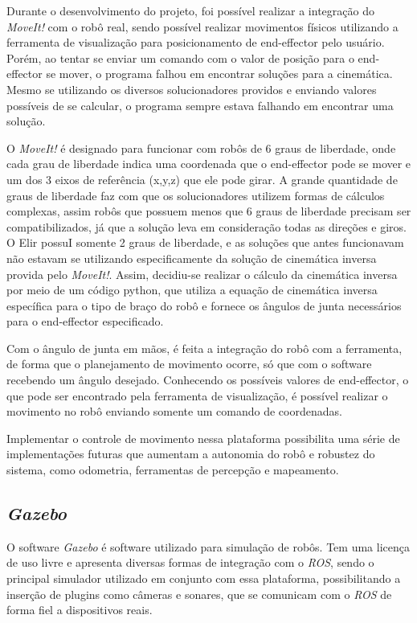 Durante o desenvolvimento do projeto, foi possível realizar a integração do \textit{MoveIt!} com o robô real, sendo possível realizar movimentos físicos utilizando a ferramenta de visualização para posicionamento de end-effector pelo usuário. Porém, ao tentar se enviar um comando com o valor de posição para o end-effector se mover, o programa falhou em encontrar soluções para a cinemática. Mesmo se utilizando os diversos solucionadores providos e enviando valores possíveis de se calcular, o programa sempre estava falhando em encontrar uma solução.

O \textit{MoveIt!} é designado para funcionar com robôs de 6 graus de liberdade, onde cada grau de liberdade indica uma coordenada que o end-effector pode se mover e um dos 3 eixos de referência (x,y,z) que ele pode girar. A grande quantidade de graus de liberdade faz com que os solucionadores utilizem formas de cálculos complexas, assim robôs que possuem menos que 6 graus de liberdade precisam ser compatibilizados, já que a solução leva em consideração todas as direções e giros. O Elir possuI somente 2 graus de liberdade, e as soluções que antes funcionavam não estavam se utilizando especificamente da solução de cinemática inversa provida pelo \textit{MoveIt!}. Assim, decidiu-se realizar o cálculo da cinemática inversa por meio de um código python, que utiliza a equação de cinemática inversa específica para o tipo de braço do robô e fornece os ângulos de junta necessários para o end-effector especificado. 

Com o ângulo de junta em mãos, é feita a integração do robô com a ferramenta, de forma que o planejamento de movimento ocorre, só que com o software recebendo um ângulo desejado. Conhecendo os possíveis valores de end-effector, o que pode ser encontrado pela ferramenta de visualização, é possível realizar o movimento no robô enviando somente um comando de coordenadas.

Implementar o controle de movimento nessa plataforma possibilita uma série de implementações futuras que aumentam a autonomia do robô e robustez do sistema, como odometria, ferramentas de percepção e mapeamento.

\subsection{\textit{Gazebo}}
O software \textit{Gazebo} é software utilizado para simulação de robôs. Tem uma licença de uso livre e apresenta diversas formas de integração com o \textit{ROS}, sendo o principal simulador utilizado em conjunto com essa plataforma, possibilitando a inserção de plugins como câmeras e sonares, que se comunicam com o \textit{ROS} de forma fiel a dispositivos reais.

